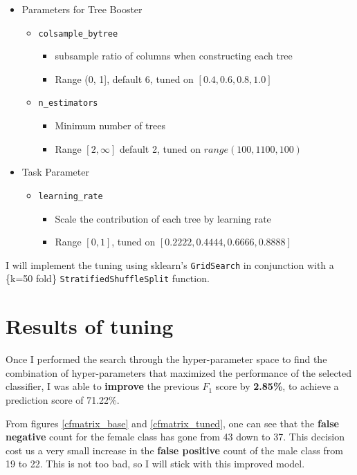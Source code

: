 \begin{itemize}
\item Parameters for Tree Booster
    \begin{itemize}
        \item \texttt{colsample\_bytree}
        \begin{itemize}
            \item subsample ratio of columns when constructing each tree
            \item Range (0, 1], default 6, tuned on $[0.4, 0.6, 0.8, 1.0]$
        \end{itemize}
        \item \texttt{n\_estimators}
        \begin{itemize}
            \item Minimum number of trees
            \item Range $[2,\infty]$ default 2, tuned on $range(100, 1100, 100)$
        \end{itemize}

    \end{itemize}

\item Task Parameter
    \begin{itemize}
        \item \texttt{learning\_rate}
        \begin{itemize}
            \item Scale the contribution of each tree by learning rate
            \item Range $[0, 1]$, tuned on $[0.2222, 0.4444, 0.6666, 0.8888]$
        \end{itemize}
    \end{itemize}
\end{itemize}
I will implement the tuning using sklearn's \texttt{GridSearch} in conjunction with a \{k=50 fold\} \texttt{StratifiedShuffleSplit} function. 

\section*{Results of tuning}
Once I performed the search through the hyper-parameter space to find the combination of hyper-parameters that maximized the performance of the selected classifier, I was able to \textbf{improve} the previous $F_1$ score by \textbf{2.85\%}, to achieve a prediction score of 71.22\%.

From figures \ref{cfmatrix_base} and \ref{cfmatrix_tuned}, one can see that the \textbf{false negative} count for the female class has gone from 43 down to 37. This decision cost us a very small increase in the \textbf{false positive} count of the male class from 19 to 22. This is not too bad, so I will stick with this improved model.

